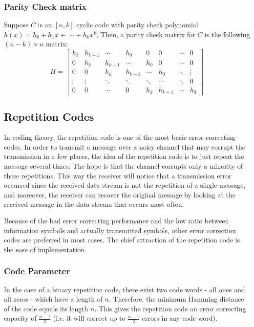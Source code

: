 \documentclass[11pt, a4paper]{article}
\begin{document}
\subsubsection{Parity Check matrix}
Suppose $C$ is an $[n, k]$ cyclic code with parity check polynomial $h(x)=h_{0}+h_{1} x+$ $\cdots+h_{k} x^{k}$. Then, a parity check matrix for $C$ is the following $(n-k) \times n$ matrix:
$$
H=\left[\begin{array}{cccccccc}
h_{k} & h_{k-1} & \cdots & h_{0} & 0 & 0 & \cdots & 0 \\
0 & h_{k} & h_{k-1} & \cdots & h_{0} & 0 & \cdots & 0 \\
0 & 0 & h_{k} & h_{k-1} & \cdots & h_{0} & \ddots & \vdots \\
\vdots & \vdots & \ddots & \ddots & \ddots & \cdots & \ddots & 0 \\
0 & 0 & \cdots & 0 & h_{k} & h_{k-1} & \cdots & h_{0}
\end{array}\right]
$$


\subsection{Repetition Codes}
In coding theory, the repetition code is one of the most basic error-correcting codes. In order to transmit a message over a noisy channel that may corrupt the transmission in a few places, the idea of the repetition code is to just repeat the message several times. The hope is
that the channel corrupts only a minority of these repetitions. This way the receiver will notice that a transmission error occurred since the
received data stream is not the repetition of a single message, and moreover, the receiver can recover the original message by looking at the received message in the data stream that occurs most often.

Because of the bad error correcting performance and the low ratio between information symbols and actually transmitted symbols, other
error correction codes are preferred in most cases. The chief attraction of the repetition code is the ease of implementation.
\subsubsection{Code Parameter}
In the case of a binary repetition code, there exist two code words - all ones and all zeros - which have a length of $n .$ Therefore, the minimum Hamming distance of the code equals its length $n$. This gives the repetition code an error correcting capacity of $\frac{n-1}{2}$ (i.e. it will correct up to $\frac{n-1}{2}$ errors in any code word).
\end{document}

